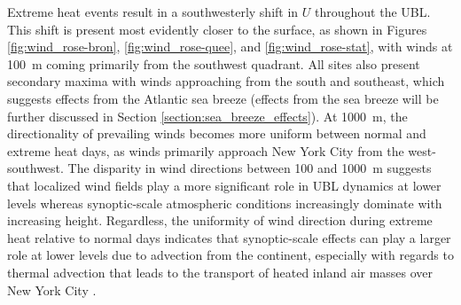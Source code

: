 \documentclass[11pt,a4paper]{article}
\begin{document}
Extreme heat events result in a southwesterly shift in $U$ throughout the UBL. This shift is present most evidently closer to the surface, as shown in Figures \ref{fig:wind_rose-bron}, \ref{fig:wind_rose-quee}, and \ref{fig:wind_rose-stat}, with winds at \SI{100}{\meter} coming primarily from the southwest quadrant. All sites also present secondary maxima with winds approaching from the south and southeast, which suggests effects from the Atlantic sea breeze (effects from the sea breeze will be further discussed in Section \ref{section:sea_breeze_effects}). At \SI{1000}{\meter}, the directionality of prevailing winds becomes more uniform between normal and extreme heat days, as winds primarily approach New York City from the west-southwest. The disparity in wind directions between 100 and \SI{1000}{\meter} suggests that localized wind fields play a more significant role in UBL dynamics at lower levels whereas synoptic-scale atmospheric conditions increasingly dominate with increasing height. Regardless, the uniformity of wind direction during extreme heat relative to normal days indicates that synoptic-scale effects can play a larger role at lower levels due to advection from the continent, especially with regards to thermal advection that leads to the transport of heated inland air masses over New York City \citep{jiang2019, ramamurthy2017b}.
\end{document}
